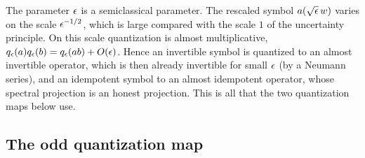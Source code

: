 \begin{discussion}
  The parameter $\epsilon$ is a semiclassical parameter. The rescaled symbol
  $a(\sqrt{\epsilon}\,w)$ varies on the scale $\epsilon^{-1/2}$, which is large compared
  with the scale $1$ of the uncertainty principle. On this scale quantization is
  almost multiplicative, $q_\epsilon(a)q_\epsilon(b)=q_\epsilon(ab)+O(\epsilon)$. Hence an
  invertible symbol is quantized to an almost invertible operator, which is
  then already invertible for small $\epsilon$ (by a Neumann series), and an idempotent symbol to an almost
  idempotent operator, whose spectral projection is an honest projection. This
  is all that the two quantization maps below use.
\end{discussion}

\subsection{The odd quantization map}


